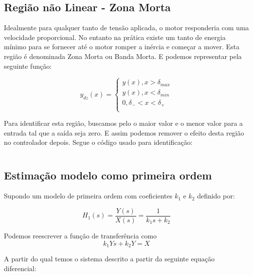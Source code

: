 \documentclass[a4paper,11pt]{article}
\begin{document}
\subsection{Região não Linear - Zona Morta}

Idealmente para qualquer tanto de tensão aplicada, o motor responderia com uma velocidade proporcional. No entanto na prática existe um tanto de energia mínimo para se fornecer até o motor romper a inércia e começar a mover. Esta região é denominada Zona Morta ou Banda Morta. E podemos representar pela seguinte função:

\begin{equation}
    y_{dz}(x) = 
    \left\{\begin{array}{c}
    y(x), x > \delta_{max} \\
    y(x), x < \delta_{min} \\
    0, \delta_{-} < x < \delta_{+} \\
\end{array} \right.
\end{equation}

Para identificar esta região, buscamos pelo o maior valor e o menor valor para a entrada tal que a saída seja zero. E assim podemos remover o efeito desta região no controlador depois. Segue o código usado para identificação:

\inputminted[frame=single,framesep=10pt]{matlab}{../src/matlab/deadzoneindetify.m}



\subsection{Estimação modelo como primeira ordem}

Supondo um modelo de primeira ordem com coeficientes $k_1$ e $k_2$ definido por:

\begin{equation}\label{eq:firstordertf}
    H_1(s) = \frac{Y(s)}{X(s)} = \frac{1}{k_1 s+ k_2}
\end{equation}


Podemos reescrever a função de transferência como
\begin{equation}
k_1 Ys + k_2 Y  = X
\end{equation}

A partir do qual temos o sistema descrito a partir da seguinte equação diferencial:
\end{document}
